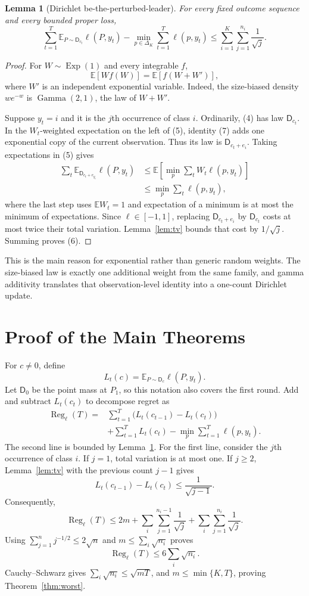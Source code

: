 \documentclass[twoside]{article}
\newtheorem{lemma}[theorem]{Lemma}
\newcommand{\E}{\mathbb E}
\newcommand{\D}{\mathsf D}
\newcommand{\Reg}{\operatorname{Reg}}
\begin{document}
\begin{lemma}[Dirichlet be-the-perturbed-leader]
\label{lem:btpl}
For every fixed outcome sequence and every bounded proper loss, \[ \sum_{t=1}^T\E_{P\sim\D_{c_t}}\ell(P,y_t) -\min_{p\in\Delta_K}\sum_{t=1}^T\ell(p,y_t) \leq\sum_{i=1}^K\sum_{j=1}^{n_i}\frac1{\sqrt j}. \tag{6} \]
\end{lemma}

\begin{proof}
For $W\sim\operatorname{Exp}(1)$ and every integrable $f$, \[ \E[Wf(W)]=\E[f(W+W')], \tag{7} \] where $W'$ is an independent exponential variable. Indeed, the size-biased density $we^{-w}$ is $\operatorname{Gamma}(2,1)$, the law of $W+W'$.

Suppose $y_t=i$ and it is the $j$th occurrence of class $i$. Ordinarily, (4) has law $\D_{c_t}$. In the $W_t$-weighted expectation on the left of (5), identity (7) adds one exponential copy of the current observation. Thus its law is $\D_{c_t+e_i}$. Taking expectations in (5) gives
\begin{align*}
\sum_t\E_{\D_{c_t+e_{y_t}}}\ell(P,y_t)
&\leq\E\!\left[\min_p\sum_tW_t\ell(p,y_t)\right]\\
&\leq\min_p\sum_t\ell(p,y_t),
\end{align*}
where the last step uses $\E W_t=1$ and expectation of a minimum is at most the minimum of expectations. Since $\ell\in[-1,1]$, replacing $\D_{c_t+e_i}$ by $\D_{c_t}$ costs at most twice their total variation. Lemma~\ref{lem:tv} bounds that cost by $1/\sqrt j$. Summing proves (6).
\end{proof}

This is the main reason for exponential rather than generic random weights. The size-biased law is exactly one additional weight from the same family, and gamma additivity translates that observation-level identity into a one-count Dirichlet update.

\section{Proof of the Main Theorems}

For $c\neq0$, define \[ L_t(c)=\E_{P\sim\D_c}\ell(P,y_t). \] Let $\D_0$ be the point mass at $P_1$, so this notation also covers the first round. Add and subtract $L_t(c_t)$ to decompose regret as
\begin{align}
\Reg_\ell(T)
={}&\sum_{t=1}^T\bigl(L_t(c_{t-1})-L_t(c_t)\bigr) \tag{8}\\
&+\sum_{t=1}^TL_t(c_t)-\min_p\sum_{t=1}^T\ell(p,y_t).\nonumber
\end{align}
The second line is bounded by Lemma~\ref{lem:btpl}. For the first line, consider the $j$th occurrence of class $i$. If $j=1$, total variation is at most one. If $j\geq2$, Lemma~\ref{lem:tv} with the previous count $j-1$ gives \[ L_t(c_{t-1})-L_t(c_t)\leq\frac1{\sqrt{j-1}}. \] Consequently, \[ \Reg_\ell(T)\leq 2m+\sum_i\sum_{j=1}^{n_i-1}\frac1{\sqrt j} +\sum_i\sum_{j=1}^{n_i}\frac1{\sqrt j}. \] Using $\sum_{j=1}^n j^{-1/2}\leq2\sqrt n$ and $m\leq\sum_i\sqrt{n_i}$ proves \[ \Reg_\ell(T)\leq6\sum_i\sqrt{n_i}. \] Cauchy--Schwarz gives $\sum_i\sqrt{n_i}\leq\sqrt{mT}$, and $m\leq\min\{K,T\}$, proving Theorem~\ref{thm:worst}.
\end{document}
